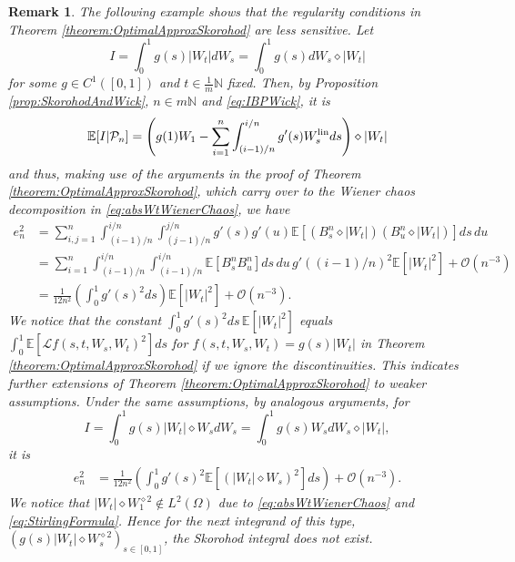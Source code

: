 \documentclass[a4paper,11pt,reqno]{amsart}
\theoremstyle{plain}
\newtheorem{remark}[theorem]{Remark}
\def\N{\mathbb{N}}
\def\Oo{\mathcal{O}}
\def\ex{\mathbb{E}}
\def\lin{{\rm lin}}
\numberwithin{equation}{section}
\begin{document}
\begin{remark}
The following example shows that the regularity conditions in Theorem \ref{theorem:OptimalApproxSkorohod} are less sensitive. Let 
\[
I=\int_{0}^{1} g(s)|W_t| dW_s = \int_{0}^{1} g(s)dW_s \diamond |W_t|
\]
for some $g \in C^1([0,1])$ and $t \in \frac{1}{m}\N$ fixed. Then, by Proposition \ref{prop:SkorohodAndWick}, $n \in m\N$ and \eqref{eq:IBPWick}, it is
\[
\ex[I|\mathcal{P}_n] = \left(g(1)W_1 - \sum_{i=1}^{n} \int_{(i-1)/n}^{i/n} g'(s) W_s^{\lin} ds\right) \diamond |W_t|
\]
and thus, making use of the arguments in the proof of Theorem \ref{theorem:OptimalApproxSkorohod}, which carry over to the Wiener chaos decomposition in \eqref{eq:absWtWienerChaos}, we have
\begin{align*}
e_n^2 &= \sum_{i,j=1}^{n} \int_{(i-1)/n}^{i/n} \int_{(j-1)/n}^{j/n} g'(s) g'(u) \ex[(B^n_s \diamond |W_t|)(B^n_u \diamond |W_t|)] ds \,du\\
&= \sum_{i=1}^{n} \int_{(i-1)/n}^{i/n} \int_{(i-1)/n}^{i/n} \ex[B^n_s B^n_u] ds \,du \,g'((i-1)/n)^2 \ex[|W_t|^2] +\Oo(n^{-3})\\
&= \frac{1}{12n^2} \left(\int_{0}^{1} g'(s)^2 ds\right) \ex[|W_t|^2] +\Oo(n^{-3}).
\end{align*}
We notice that the constant $\int_{0}^{1} g'(s)^2 ds\, \ex[|W_t|^2]$ equals $\int_{0}^{1}\ex[\mathcal{L} f(s, t,W_s,W_{t})^2] ds$ for $f(s,t,W_s,W_t) = g(s)|W_t|$ in Theorem \ref{theorem:OptimalApproxSkorohod} if we ignore the discontinuities. This indicates further extensions of Theorem \ref{theorem:OptimalApproxSkorohod} to weaker assumptions. Under the same assumptions, by analogous arguments, for 
\[
I=\int_{0}^{1} g(s)|W_t|\diamond W_s dW_s = \int_{0}^{1} g(s)W_s dW_s \diamond |W_t|,
\]
it is
\begin{align*}
e_n^2 &= \frac{1}{12n^2} \left(\int_{0}^{1} g'(s)^2 \ex\left[\left(|W_t|\diamond W_s\right)^2\right] ds\right) +\Oo(n^{-3}).
\end{align*}
We notice that $|W_t| \diamond W_1^{\diamond 2} \notin L^2(\Omega)$ due to \eqref{eq:absWtWienerChaos} and \eqref{eq:StirlingFormula}. Hence for the next integrand of this type, $(g(s) |W_t| \diamond W_s^{\diamond 2})_{s \in [0,1]}$, the Skorohod integral does not exist.
\end{remark}
\end{document}
